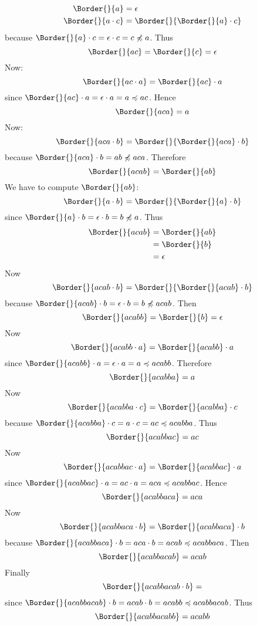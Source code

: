 \[
\begin{aligned}
   \Border{}{a} 
&= \epsilon\\
   \Border{}{a \cdot c} 
&= \Border{}{\Border{}{a} \cdot c}
\end{aligned}
\]
because \(\Border{}{a} \cdot c = \epsilon \cdot c = c
\not\preccurlyeq a\). Thus
\[
  \Border{}{ac} = \Border{}{c} = \epsilon
\]
Now:
\[
 \Border{}{ac \cdot a} = \Border{}{ac} \cdot a
\]
since \(\Border{}{ac} \cdot a = \epsilon \cdot a = a
\preccurlyeq ac\). Hence
\[
  \Border{}{aca} = a
\]
Now:
\[
  \Border{}{aca \cdot b} = \Border{}{\Border{}{aca} \cdot b}
\]
because \(\Border{}{aca} \cdot b = ab \not\preccurlyeq
aca\). Therefore
\[
  \Border{}{acab} = \Border{}{ab}
\]
We have to compute \(\Border{}{ab}\):
\[
  \Border{}{a \cdot b} = \Border{}{\Border{}{a} \cdot b}
\]
since \(\Border{}{a} \cdot b = \epsilon \cdot b = b
\not\preccurlyeq a\). Thus
\begin{align*}
   \Border{}{acab}
&= \Border{}{ab}\\
&= \Border{}{b}\\ 
&= \epsilon
\end{align*}
Now
\[
  \Border{}{acab \cdot b} = \Border{}{\Border{}{acab} \cdot b}
\]
because \(\Border{}{acab} \cdot b = \epsilon \cdot b = b
\not\preccurlyeq acab\). Then
\[
  \Border{}{acabb} = \Border{}{b} = \epsilon
\]
Now
\[
  \Border{}{acabb \cdot a} = \Border{}{acabb} \cdot a
\]
since \(\Border{}{acabb} \cdot a = \epsilon \cdot a = a
\preccurlyeq acabb\). Therefore
\[
  \Border{}{acabba} = a
\]
Now
\[
  \Border{}{acabba \cdot c} = \Border{}{acabba} \cdot c
\]
because \(\Border{}{acabba} \cdot c = a \cdot c = ac
\preccurlyeq acabba\). Thus
\[
  \Border{}{acabbac} = ac
\]
Now
\[
  \Border{}{acabbac \cdot a} = \Border{}{acabbac} \cdot a
\]
since \(\Border{}{acabbac} \cdot a = ac \cdot a = aca
\preccurlyeq acabbac\). Hence
\[
  \Border{}{acabbaca} = aca
\]
Now
\[
  \Border{}{acabbaca \cdot b} = \Border{}{acabbaca} \cdot b
\]
because \(\Border{}{acabbaca} \cdot b = aca \cdot b = acab
\preccurlyeq acabbaca\). Then
\[
  \Border{}{acabbacab} = acab
\]
Finally
\[
  \Border{}{acabbacab \cdot b} = 
\]
since \(\Border{}{acabbacab} \cdot b = acab \cdot b = acabb
\preccurlyeq acabbacab\). Thus
\[
  \Border{}{acabbacabb} = acabb
\]
